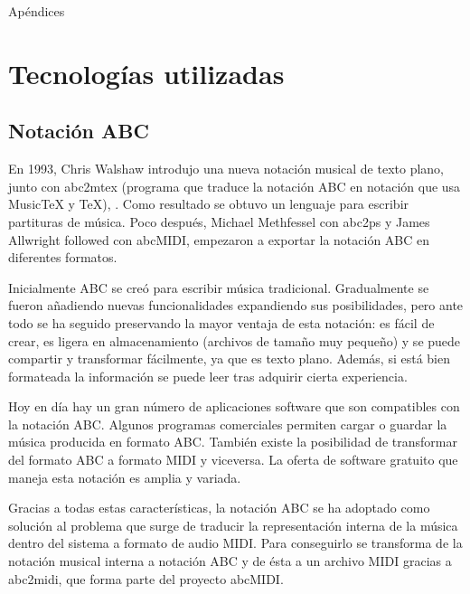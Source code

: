     \thispagestyle{plain}
	\vspace*{\fill}
    \begin{center}
      {\Huge Apéndices}\\[0.5cm]
    \end{center}
    \vspace*{\fill}


\appendix

\chapter{Tecnologías utilizadas}
\label{chap:techs}

\makeatletter
\def\cleardoublepage{\clearpage\if@twoside \ifodd\c@page\else
  \hbox{}
  \vspace*{\fill}
  \newpage
  \if@twocolumn\hbox{}\newpage\fi\fi\fi}
\makeatother

\section{Notación ABC}
\label{sec:NotacionABC}

En 1993, Chris Walshaw introdujo una nueva notación musical de texto plano, junto con abc2mtex (programa que traduce la notación ABC en notación que usa MusicTeX y TeX), \cite{abcDescrip}. Como resultado se obtuvo un lenguaje para escribir partituras de música. Poco después, Michael Methfessel con abc2ps y James Allwright followed con abcMIDI, empezaron a exportar la notación ABC en diferentes formatos.

Inicialmente ABC se creó para escribir música tradicional. Gradualmente se fueron añadiendo nuevas funcionalidades expandiendo sus posibilidades, pero ante todo se ha seguido preservando la mayor ventaja de esta notación: es fácil de crear, es ligera en almacenamiento (archivos de tamaño muy pequeño) y se puede compartir y transformar fácilmente, ya que es texto plano. Además, si está bien formateada la información se puede leer tras adquirir cierta experiencia.

Hoy en día hay un gran número de aplicaciones software que son compatibles con la notación ABC. Algunos programas comerciales permiten cargar o guardar la música producida en formato ABC. También existe la posibilidad de transformar del formato ABC a formato MIDI y viceversa. La oferta de software gratuito que maneja esta notación es amplia y variada. 

Gracias a todas estas características, la notación ABC se ha adoptado como solución al problema que surge de traducir la representación interna de la música dentro del sistema a formato de audio MIDI. Para conseguirlo se transforma de la notación musical interna a notación ABC y de ésta a un archivo MIDI gracias a abc2midi, que forma parte del proyecto abcMIDI.

